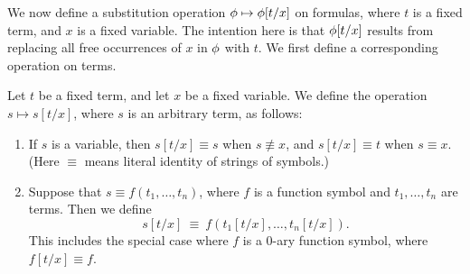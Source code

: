 We now define a substitution operation $\phi\mapsto \phi [t/x]$ on
formulas, where $t$ is a fixed term, and $x$ is a fixed variable.  The
intention here is that $\phi [t/x]$ results from replacing all free
occurrences of $x$ in $\phi$ with $t$.  We first define a corresponding
operation on terms.

\begin{defn} Let $t$ be a fixed term, and let $x$ be a fixed variable.
  We define the operation $s\mapsto s[t/x]$, where $s$ is an arbitrary
  term, as follows:
  \begin{enumerate}
  \item If $s$ is a variable, then $s[t/x]\equiv s$ when
    $s\not\equiv x$, and $s[t/x]\equiv t$ when $s\equiv x$.  (Here
    $\equiv$ means literal identity of strings of symbols.)
  \item Suppose that $s\equiv f(t_1,\dots ,t_n)$, where $f$ is a function
    symbol and $t_1,\dots ,t_n$ are terms.  Then we define 
    \[ s[t/x] \: \equiv \: f(t_1[t/x],\dots ,t_n[t/x]) .\] This
    includes the special case where $f$ is a $0$-ary function symbol,
    where $f[t/x]\equiv f$.
  \end{enumerate}
\end{defn}

